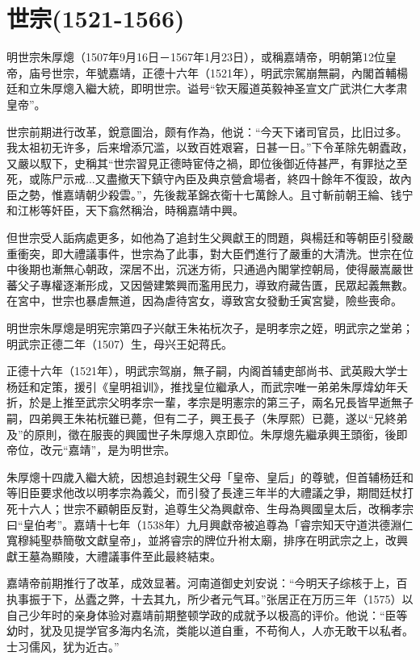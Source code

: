 
\section{世宗\tiny(1521-1566)}

明世宗朱厚熜（1507年9月16日－1567年1月23日），或稱嘉靖帝，明朝第12位皇帝，庙号世宗，年號嘉靖，正德十六年（1521年），明武宗駕崩無嗣，內閣首輔楊廷和立朱厚熜入繼大統，即明世宗。谥号“钦天履道英毅神圣宣文广武洪仁大孝肃皇帝”。

世宗前期进行改革，銳意圖治，颇有作為，他说：“今天下诸司官员，比旧过多。我太祖初无许多，后来增添冗滥，以致百姓艰窘，日甚一日。”下令革除先朝蠹政，又嚴以馭下，史稱其“世宗習見正德時宦侍之禍，即位後御近侍甚严，有罪挞之至死，或陈尸示戒...又盡撤天下鎮守內臣及典京營倉場者，終四十餘年不復設，故內臣之勢，惟嘉靖朝少殺雲。”，先後裁革錦衣衛十七萬餘人。且寸斬前朝王綸、钱宁和江彬等奸臣，天下翕然稱治，時稱嘉靖中興。

但世宗受人詬病處更多，如他為了追封生父興獻王的問題，與楊廷和等朝臣引發嚴重衝突，即大禮議事件，世宗為了此事，對大臣們進行了嚴重的大清洗。世宗在位中後期也漸無心朝政，深居不出，沉迷方術，只通過內閣掌控朝局，使得嚴嵩嚴世蕃父子專權逐漸形成，又因營建繁興而濫用民力，導致府藏告匱，民眾起義無數。在宮中，世宗也暴虐無道，因為虐待宮女，導致宮女發動壬寅宮變，險些喪命。

明世宗朱厚熜是明宪宗第四子兴献王朱祐杬次子，是明孝宗之姪，明武宗之堂弟；明武宗正德二年（1507）生，母兴王妃蒋氏。

正德十六年（1521年），明武宗驾崩，無子嗣，内阁首辅吏部尚书、武英殿大学士杨廷和定策，援引《皇明祖训》，推找皇位繼承人，而武宗唯一弟弟朱厚煒幼年夭折，於是上推至武宗父明孝宗一輩，孝宗是明憲宗的第三子，兩名兄長皆早逝無子嗣，四弟興王朱祐杬雖已薨，但有二子，興王長子（朱厚熙）已薨，遂以“兄終弟及”的原則，徵在服喪的興國世子朱厚熜入京即位。朱厚熜先繼承興王頭銜，後即帝位，改元“嘉靖”，是为明世宗。

朱厚熜十四歲入繼大統，因想追封親生父母「皇帝、皇后」的尊號，但首辅杨廷和等旧臣要求他改以明孝宗為義父，而引發了長達三年半的大禮議之爭，期間廷杖打死十六人；世宗不顧朝臣反對，追尊生父為興獻帝、生母為興國皇太后，改稱孝宗曰“皇伯考”。嘉靖十七年（1538年）九月興獻帝被追尊為「睿宗知天守道洪德淵仁寬穆純聖恭簡敬文獻皇帝」，並將睿宗的牌位升袝太廟，排序在明武宗之上，改興獻王墓為顯陵，大禮議事件至此最終結束。

嘉靖帝前期推行了改革，成效显著。河南道御史刘安说：“今明天子综核于上，百执事振于下，丛蠹之弊，十去其九，所少者元气耳。”张居正在万历三年（1575）以自己少年时的亲身体验对嘉靖前期整顿学政的成就予以极高的评价。他说：“臣等幼时，犹及见提学官多海内名流，类能以道自重，不苟徇人，人亦无敢干以私者。士习儒风，犹为近古。”

